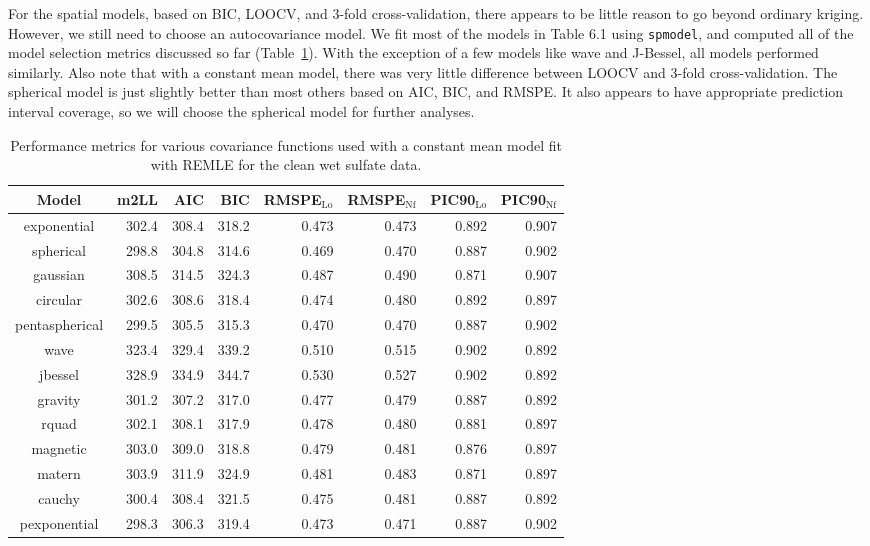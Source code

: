 \documentclass[12pt, titlepage]{article}
\begin{document}
For the spatial models, based on BIC, LOOCV, and 3-fold cross-validation, there appears to be little reason to go beyond ordinary kriging.  However, we still need to choose an autocovariance model.  We fit most of the models in Table 6.1 using \texttt{spmodel}, and computed all of the model selection metrics discussed so far (Table~\ref{tab:ModelSelAutocov}).  With the exception of a few models like wave and J-Bessel, all models performed similarly. Also note that with a constant mean model, there was very little difference between LOOCV and 3-fold cross-validation. The spherical model is just slightly better than most others based on AIC, BIC, and RMSPE.  It also appears to have appropriate prediction interval coverage, so we will choose the spherical model for further analyses.
\begin{table}[h] 
				\caption{Performance metrics for various covariance functions used with a constant mean model fit with REMLE for the clean wet sulfate data. \label{tab:ModelSelAutocov}}
\begin{center}
\begin{tabular}{c|rrrrrrr}
  \hline
  \hline
  Model & m2LL & AIC & BIC & RMSPE$_{\textrm{Lo}}$ & RMSPE$_{\textrm{Nf}}$ & PIC90$_{\textrm{Lo}}$ & PIC90$_{\textrm{Nf}}$ \\
	\hline
  \hline
exponential & 302.4 & 308.4 & 318.2 & 0.473 & 0.473 & 0.892 & 0.907 \\ 
  spherical & 298.8 & 304.8 & 314.6 & 0.469 & 0.470 & 0.887 & 0.902 \\ 
  gaussian & 308.5 & 314.5 & 324.3 & 0.487 & 0.490 & 0.871 & 0.907 \\ 
  circular & 302.6 & 308.6 & 318.4 & 0.474 & 0.480 & 0.892 & 0.897 \\ 
  pentaspherical & 299.5 & 305.5 & 315.3 & 0.470 & 0.470 & 0.887 & 0.902 \\ 
  wave & 323.4 & 329.4 & 339.2 & 0.510 & 0.515 & 0.902 & 0.892 \\ 
  jbessel & 328.9 & 334.9 & 344.7 & 0.530 & 0.527 & 0.902 & 0.892 \\ 
  gravity & 301.2 & 307.2 & 317.0 & 0.477 & 0.479 & 0.887 & 0.892 \\ 
  rquad & 302.1 & 308.1 & 317.9 & 0.478 & 0.480 & 0.881 & 0.897 \\ 
  magnetic & 303.0 & 309.0 & 318.8 & 0.479 & 0.481 & 0.876 & 0.897 \\ 
  matern & 303.9 & 311.9 & 324.9 & 0.481 & 0.483 & 0.871 & 0.897 \\ 
  cauchy & 300.4 & 308.4 & 321.5 & 0.475 & 0.481 & 0.887 & 0.892 \\ 
  pexponential & 298.3 & 306.3 & 319.4 & 0.473 & 0.471 & 0.887 & 0.902 \\
   \hline
	\hline
\end{tabular}
\end{center}
\end{table}
\end{document}
